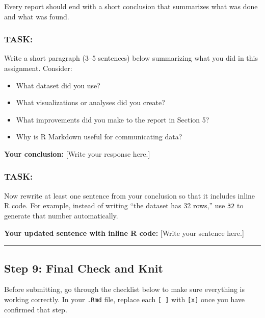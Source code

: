 \documentclass[
]{article}
\providecommand{\tightlist}{%
  \setlength{\itemsep}{0pt}\setlength{\parskip}{0pt}}
\begin{document}
Every report should end with a short conclusion that summarizes what was
done and what was found.

\subsubsection{TASK:}\label{task-18}

Write a short paragraph (3--5 sentences) below summarizing what you did
in this assignment. Consider:

\begin{itemize}
\tightlist
\item
  What dataset did you use?
\item
  What visualizations or analyses did you create?
\item
  What improvements did you make to the report in Section 5?
\item
  Why is R Markdown useful for communicating data?
\end{itemize}

\textbf{Your conclusion:} {[}Write your response here.{]}

\subsubsection{TASK:}\label{task-19}

Now rewrite at least one sentence from your conclusion so that it
includes inline R code. For example, instead of writing ``the dataset
has 32 rows,'' use \texttt{32} to generate that number automatically.

\textbf{Your updated sentence with inline R code:} {[}Write your
sentence here.{]}

\begin{center}\rule{0.5\linewidth}{0.5pt}\end{center}

\subsection{Step 9: Final Check and
Knit}\label{step-9-final-check-and-knit}

Before submitting, go through the checklist below to make sure
everything is working correctly. In your \texttt{.Rmd} file, replace
each \texttt{{[}\ {]}} with \texttt{{[}x{]}} once you have confirmed
that step.
\end{document}
